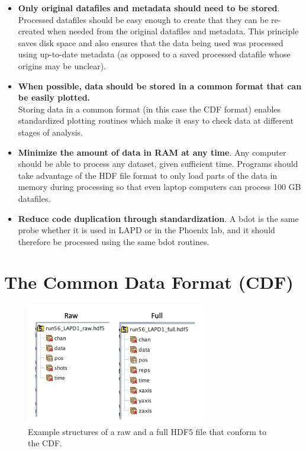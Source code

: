\documentclass[12pt]{article}
\begin{document}
\begin{itemize}

\item \textbf{Only original datafiles and metadata should need to be stored}.\\ Processed datafiles should be easy enough to create that they can be re-created when needed from the original datafiles and metadata. This principle saves disk space and also ensures that the data being used was processed using up-to-date metadata (as opposed to a saved processed datafile whose origins may be unclear). 

\item \textbf{When possible, data should be stored in a common format that can be easily plotted.}\\ Storing data in a common format (in this case the CDF format) enables standardized plotting routines which make it easy to check data at different stages of analysis. 

\item \textbf{Minimize the amount of data in RAM at any time}. Any computer should be able to process any dataset, given sufficient time. Programs should take advantage of the HDF file format to only load parts of the data in memory during processing so that even laptop computers can process 100 GB datafiles.

\item \textbf{Reduce code duplication through standardization}. A bdot is the same probe whether it is used in LAPD or in the Phoenix lab, and it should therefore be processed using the same bdot routines.

\end{itemize}


\section{The Common Data Format (CDF)\label{cdf}}

\begin{figure}[h]
\centering
\includegraphics[width=0.7\textwidth]{hdf5_struct}
\caption[Example of CDF HDF5 Files]
{\label{hdf5_struct} Example structures of a raw and a full HDF5 file that conform to the CDF.}
\end{figure}
\end{document}

